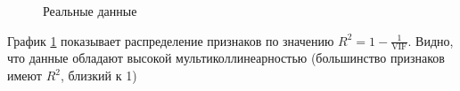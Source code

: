 \documentclass[12pt,twoside]{article}
\begin{document}
\begin{figure}[H]
	\caption{Реальные данные}
	\label{fg:VIF}
\end{figure}

График \ref{fg:VIF} показывает распределение признаков по значению $R^2=1-\frac{1}{\mbox{VIF}}$. Видно, что данные обладают высокой мультиколлинеарностью (большинство признаков имеют $R^2$, близкий к 1)
\end{document}
